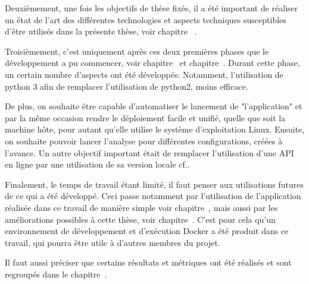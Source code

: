 Deuxièmement, une fois les objectifs de thèse fixés, il a été important de réaliser un état de l'art des différentes technologies et aspects techniques susceptibles d'être utilisés dans la présente thèse, voir chapitre~ .

Troisièmement, c'est uniquement après ces deux premières phases que le développement a pu commencer, voir chapitre~ et chapitre~.
Durant cette phase, un certain nombre d'aspects ont été développés:
Notamment, l'utilisation de python 3 afin de remplacer l'utilisation de python2, moins efficace.

De plus, on souhaite être capable d'automatiser le lancement de "l'application" et par la même occasion rendre le déploiement facile et unifié, quelle que soit la machine hôte, pour autant qu'elle utilise le système d'exploitation Linux. Ensuite, on souhaite pouvoir lancer l'analyse pour différentes configurations, créées à l'avance. Un autre objectif important était de remplacer l'utilisation d'une API en ligne par une utilisation de sa version locale cf..

Finalement, le temps de travail étant limité, il faut penser aux utilisations futures de ce qui a été développé. Ceci passe notamment par l'utilisation de l'application réalisée dans ce travail de manière simple voir chapitre~, mais aussi par les améliorations possibles à cette thèse, voir chapitre~. C'est pour cela qu'un environnement de développement et d'exécution Docker a été produit dans ce travail, qui pourra être utile à d'autres membres du projet. 

Il faut aussi préciser que certains résultats et métriques ont été réalisés et sont regroupés dans le chapitre~.

